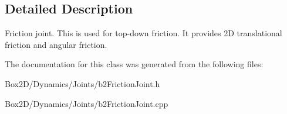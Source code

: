 \subsection{Detailed Description}
Friction joint. This is used for top-\/down friction. It provides 2D translational friction and angular friction. 

The documentation for this class was generated from the following files\+:\begin{DoxyCompactItemize}
\item 
Box2\+D/\+Dynamics/\+Joints/b2\+Friction\+Joint.\+h\item 
Box2\+D/\+Dynamics/\+Joints/b2\+Friction\+Joint.\+cpp\end{DoxyCompactItemize}
